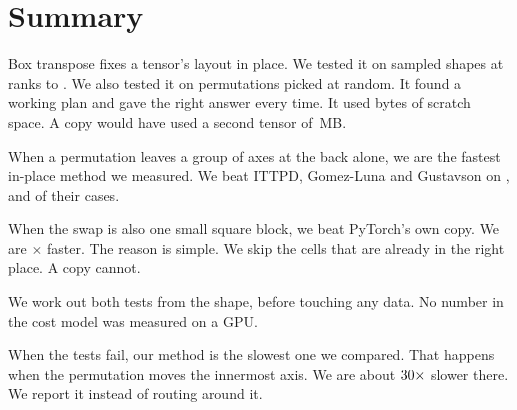 \section{Summary}
\label{sec:conclusion}

Box transpose fixes a tensor's layout in place. We tested it on \resCases{}
sampled shapes at ranks \resRankLo{} to \resRankHi{}. We also tested it on
\hardCases{} permutations picked at random. It found a working plan and gave
the right answer every time. It used \resBoxAux{} bytes of scratch space. A
copy would have used a second tensor of \resTensorMB{}\,MB.

When a permutation leaves a group of axes at the back alone, we are the fastest
in-place method we measured. We beat ITTPD, Gomez-Luna and Gustavson on
\resWinIttpd{}, \resWinGl{} and \resWinGv{} of their cases.

When the swap is also one small square block, we beat PyTorch's own copy. We
are \tierBeatsX{}$\times$ faster. The reason is simple. We skip the cells that
are already in the right place. A copy cannot.

We work out both tests from the shape, before touching any data. No number in
the cost model was measured on a GPU.

When the tests fail, our method is the slowest one we compared. That happens
when the permutation moves the innermost axis. We are about
$30\times$ slower there. We report it instead of routing around
it.
